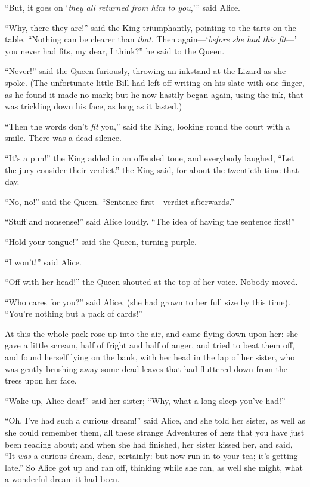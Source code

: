 \documentclass[11pt,openany,oneside]{book}
\begin{document}
“But, it goes on ‘{\em they all returned from him to you\/},’” said Alice. 

“Why, there they are!” said the King triumphantly, pointing to the tarts on the table. “Nothing can be clearer than {\em that\/}. Then again—‘{\em before she had this fit\/}—’ you never had fits, my dear, I think?” he said to the Queen. 

“Never!” said the Queen furiously, throwing an inkstand at the Lizard as she spoke. (The unfortunate little Bill had left off writing on his slate with one finger, as he found it made no mark; but he now hastily began again, using the ink, that was trickling down his face, as long as it lasted.) 

“Then the words don’t {\em fit\/} you,” said the King, looking round the court with a smile. There was a dead silence. 

“It’s a pun!” the King added in an offended tone, and everybody laughed, “Let the jury consider their verdict.” the King said, for about the twentieth time that day. 

“No, no!” said the Queen. “Sentence first—verdict afterwards.” 

“Stuff and nonsense!” said Alice loudly. “The idea of having the sentence first!” 

“Hold your tongue!” said the Queen, turning purple. 

“I won’t!” said Alice. 

“Off with her head!” the Queen shouted at the top of her voice. Nobody moved. 

“Who cares for you?” said Alice, (she had grown to her full size by this time). “You’re nothing but a pack of cards!” 

At this the whole pack rose up into the air, and came flying down upon her: she gave a little scream, half of fright and half of anger, and tried to beat them off, and found herself lying on the bank, with her head in the lap of her sister, who was gently brushing away some dead leaves that had fluttered down from the trees upon her face. 

“Wake up, Alice dear!” said her sister; “Why, what a long sleep you’ve had!” 

“Oh, I’ve had such a curious dream!” said Alice, and she told her sister, as well as she could remember them, all these strange Adventures of hers that you have just been reading about; and when she had finished, her sister kissed her, and said, “It {\em was\/} a curious dream, dear, certainly: but now run in to your tea; it’s getting late.” So Alice got up and ran off, thinking while she ran, as well she might, what a wonderful dream it had been. 
\end{document}
